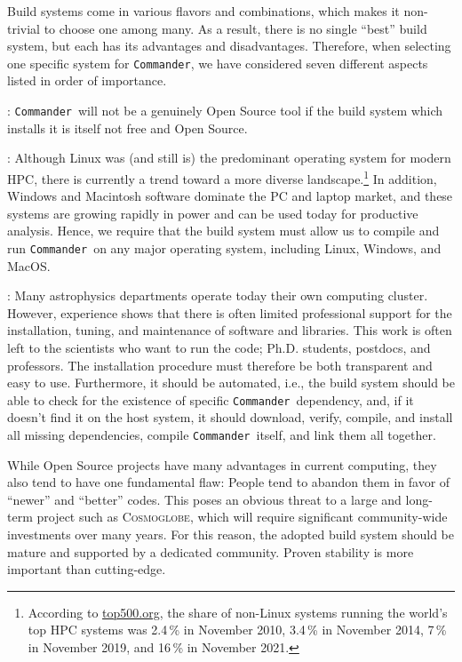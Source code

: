 \documentclass[twocolumn]{aa}
\def\commander{\texttt{Commander}}
\newcommand{\cosmoglobe}{\textsc{Cosmoglobe}}
\begin{document}
Build systems come in various flavors and combinations, which makes it non-trivial to choose one among many. As a result, there is no single ``best'' build system, but each has its advantages and disadvantages. Therefore, when selecting one specific system for \commander, we have considered seven different aspects listed in order of importance.

: \commander\ will not be a genuinely Open Source tool if the build system which installs it is itself not free and Open Source.

: Although Linux was (and still is) the predominant operating system for modern HPC, there is currently a trend toward a more diverse landscape.\footnote{According to \href{https://www.top500.org/statistics/list/}{top500.org}, the share of non-Linux systems running the world's top HPC systems was 2.4\,\% in November 2010, 3.4\,\% in November 2014, 7\,\% in November 2019, and 16\,\% in November 2021.} In addition, Windows and Macintosh software dominate the PC and laptop market, and these systems are growing rapidly in power and can be used today for productive analysis. Hence, we require that the build system must allow us to compile and run \commander\ on any major operating system, including Linux, Windows, and MacOS.

: Many astrophysics departments operate today their own computing cluster. However, experience shows that there is often limited professional support for the installation, tuning, and maintenance of software and libraries. This work is often left to the scientists who want to run the code; Ph.D. students, postdocs, and professors. The installation procedure must therefore be both transparent and easy to use. Furthermore, it should be automated, i.e., the build system should be able to check for the existence of specific \commander\ dependency, and, if it doesn't find it on the host system, it should download, verify, compile, and install all missing dependencies, compile \commander\ itself, and link them all together.

 While Open Source projects have many advantages in current computing, they also tend to have one fundamental flaw: People tend to abandon them in favor of ``newer'' and ``better'' codes. This poses an obvious threat to a large and long-term project such as \cosmoglobe, which will require significant community-wide investments over many years. For this reason, the adopted build system should be mature and supported by a dedicated community. Proven stability is more important than cutting-edge.
\end{document}
